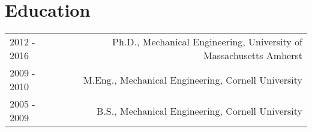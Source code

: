 \section*{Education}
\begin{tabular}{L!{\VRule}R}
2012 - 2016& Ph.D., Mechanical Engineering, University of Massachusetts Amherst\\
2009 - 2010& M.Eng., Mechanical Engineering, Cornell University \\
2005 - 2009& B.S., Mechanical Engineering, Cornell University 
\end{tabular}
